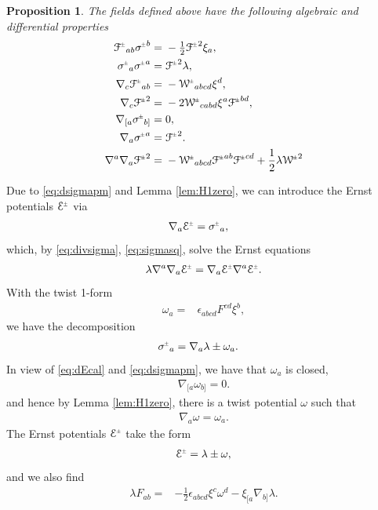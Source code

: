\documentclass[a4paper,10pt,reqno]{amsart}
\newcommand{\cE}{\mathcal{E}}
\theoremstyle{plain}
\newtheorem{prop}[thm]{Proposition}
\newcommand{\PM}[1]{{{#1}^{\hspace{-.5pt}\scaleto{\pm}{3.5pt}}}}
\def\Wcal{\mathcal{W}}
\def\Fcal{\mathcal{F}}
\def\Ecal{\mathcal{E}}
\numberwithin{equation}{section}
\begin{document}
\begin{prop}  \label{prop:xi-id} 
The fields defined above have the following algebraic and differential properties
\begin{subequations} \label{eq:xi-id}
\begin{align}
%
%
\PM{\Fcal}_{ab} \PM{\sigma}^{b}={}&- \tfrac{1}{2} \PM{\Fcal}^2\xi_{a}, \label{eq:Fsigma} \\
\PM{\sigma}_{a} \PM{\sigma}^{a}={}& \PM{\Fcal}^2 \lambda, \label{eq:sigmasq}\\
\nabla_{c}\PM{\Fcal}_{ab}={}&- \PM{\Wcal}_{abcd} \xi^{d}, \label{eq:nablaFcal} \\
\nabla_{c}\PM{\Fcal}^2={}&-2  \PM{\Wcal}_{cabd} \xi^{a}\PM{\Fcal}^{bd}, \label{eq:nablaFsq}\\
\nabla_{[a}\PM{\sigma}_{b]} ={}& 0, \label{eq:dsigmapm} \\
\nabla_{a}\PM{\sigma}^{a}={}&\PM{\Fcal}^2. \label{eq:divsigma} \\
\nabla^a \nabla_a \PM{\Fcal}^2
={}& 
- \PM{\Wcal}_{abcd} \PM{\Fcal}^{ab} \PM{\Fcal}^{cd}
+ \frac{1}{2} \lambda  \PM{\Wcal}^2\label{eq:laplaceFsq}
\end{align}
\end{subequations}
\end{prop}

Due to \eqref{eq:dsigmapm} and Lemma \ref{lem:H1zero}, 
we can introduce the Ernst potentials $\PM{\Ecal}$ via
\begin{align} \label{eq:Epm}
\nabla_{a}\PM{\Ecal}={}&\PM{\sigma}_{a},
\end{align}
which, by \eqref{eq:divsigma}, \eqref{eq:sigmasq}, solve the Ernst equations
\begin{align}\label{eq:DeltaEcal}
\lambda \nabla^a \nabla_a \PM{\Ecal} = \nabla_a \PM{\Ecal} \nabla^a \PM{\Ecal}.
\end{align}
With the twist 1-form
\begin{align}
\omega_{a}={}&\epsilon_{abcd} F^{cd} \xi^{b},
\end{align}
we have the decomposition
\begin{align} \label{eq:dEcal}
\PM{\sigma}_{a}={}& \nabla_{a}\lambda \pm \omega_{a}.
\end{align}
In view of \eqref{eq:dEcal}  and \eqref{eq:dsigmapm}, we have that $\omega_{a}$ is closed, 
\begin{align} 
\nabla_{[a} \omega_{b]} = 0. 
\end{align} 
and hence by Lemma \ref{lem:H1zero}, there is a  twist potential $\omega$  such that 
\begin{align} 
\nabla_a \omega = \omega_a. 
\end{align} 
The Ernst potentials $\PM{\cE}$ take the form
\begin{align} \label{eq:Ecal-lam-om} 
\PM{\Ecal} = \lambda \pm \omega,
\end{align}
and we also find  
\begin{align}
\lambda F_{ab} ={}&- \tfrac{1}{2} \epsilon_{abcd} \xi^{c} \omega^{d}
-\xi_{[a}\nabla_{b]}\lambda .
\end{align}
%
\end{document}
